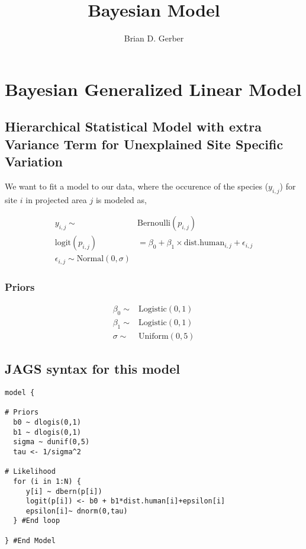 \documentclass[12pt]{article}
\title{Bayesian  Model}
\author{Brian D. Gerber}
\begin{document}
\maketitle
\section{Bayesian Generalized Linear Model}
\subsection{Hierarchical Statistical Model with extra Variance Term for Unexplained Site Specific Variation}

\Large

We want to fit a model to our data, where the occurence of the species ($y_{i,j}$) for site $i$ in projected area $j$ is modeled as,

\begin{align*}
y_{i,j}\sim& \text{Bernoulli}(p_{i,j})\\
\text{logit}(p_{i,j}) &= \beta_{0} + \beta_{1}\times \text{dist.human}_{i,j}+ \epsilon_{i,j}\\
\epsilon_{i,j} \sim \text{Normal}(0,\sigma)
\end{align*}

\subsubsection{Priors}

\begin{align*}
\beta_{0} \sim& \text{Logistic}(0, 1)\\
\beta_{1} \sim& \text{Logistic}(0, 1)\\
\sigma \sim& \text{Uniform}(0,5)
\end{align*}


\pagebreak

\subsection{JAGS syntax for this model}

\begin{verbatim}
model {

# Priors
  b0 ~ dlogis(0,1)
  b1 ~ dlogis(0,1)
  sigma ~ dunif(0,5)
  tau <- 1/sigma^2

# Likelihood
  for (i in 1:N) {
     y[i] ~ dbern(p[i])
     logit(p[i]) <- b0 + b1*dist.human[i]+epsilon[i]
     epsilon[i]~ dnorm(0,tau)
  } #End loop
  
} #End Model
\end{verbatim}
\end{document}
